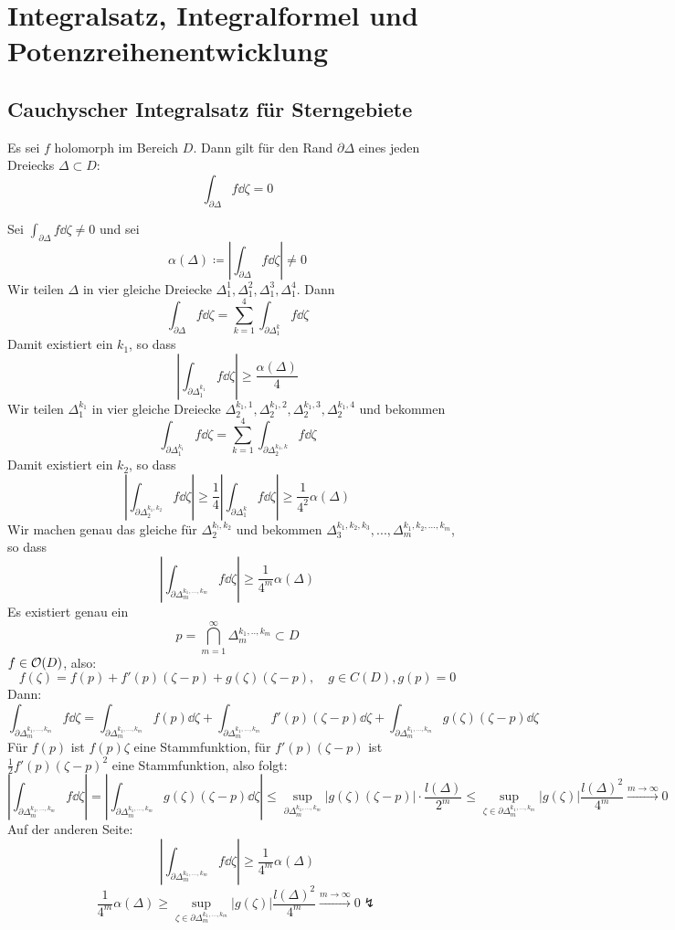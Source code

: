 \chapter{Integralsatz, Integralformel und Potenzreihenentwicklung}
\section{Cauchyscher Integralsatz f\"ur Sterngebiete}
\begin{lemma}
Es sei $ f $ holomorph im Bereich $ D $. Dann gilt f\"ur den Rand $ \partial \Delta $ eines jeden Dreiecks $ \Delta\subset D $:
\[ \int_{\partial\Delta}^{} f\dd\zeta = 0 \]
\end{lemma}
\begin{beweis}
Sei $ \int_{\partial\Delta}^{} f\dd\zeta\neq 0 $ und sei \[ \alpha(\Delta)\coloneqq\left|\int_{\partial\Delta}^{} f\dd\zeta\right|\neq 0 \]
Wir teilen $ \Delta $ in vier gleiche Dreiecke $ \Delta_1^1, \Delta_1^2,\Delta_1^3,\Delta_1^4 $. Dann
\[ \int_{\partial\Delta}f\dd\zeta=\sum_{k=1}^{4}\int_{\partial\Delta_1^k}^{}f\dd\zeta \]
Damit existiert ein $ k_1 $, so dass
\[ \left|\int_{\partial\Delta_1^{k_1}}f\dd\zeta\right|\geq\frac{\alpha(\Delta)}{4} \]
Wir teilen $ \Delta_1^{k_1} $ in vier gleiche Dreiecke $ \Delta_2^{k_1,1},\Delta_2^{k_1,2},\Delta_2^{k_1,3},\Delta_2^{k_1,4} $ und bekommen
\[ \int_{\partial\Delta_1^{k_1}}f\dd\zeta=\sum_{k=1}^4\int_{\partial\Delta_2^{k_1,k}}f\dd\zeta \]
Damit existiert ein $ k_2 $, so dass
\[ \left|\int_{\partial\Delta_2^{k_1,k_2}}^{}f\dd\zeta\right|\geq\frac{1}{4}\left|\int_{\partial\Delta_1^k}^{}f\dd\zeta\right|\geq\frac{1}{4^2}\alpha(\Delta) \]
Wir machen genau das gleiche f\"ur $ \Delta_2^{k_!,k_2} $ und bekommen $ \Delta_3^{k_1,k_2,k_3},...,\Delta_m^{k_1,k_2,...,k_m} $, so dass
\[ \left|\int_{\partial\Delta_m^{k_1,...,k_m}}^{} f\dd\zeta\right|\geq\frac{1}{4^m}\alpha(\Delta) \]
Es existiert genau ein \[ p=\bigcap_{m=1}^\infty \Delta_m^{k_1,..,k_m}\subset D\]
$ f\in\mathcal O(D) $, also:
\[ f(\zeta)=f(p)+f'(p)(\zeta-p)+g(\zeta)(\zeta-p),\quad g\in C(D),g(p)=0 \]
Dann:
\[ \int_{\partial\Delta_m^{k_1,...,k_m}}^{}f\dd\zeta=\int_{\partial\Delta_m^{k_1,...,k_m}}^{}f(p)\dd\zeta+\int_{\partial\Delta_m^{k_1,...,k_m}}^{}f'(p)(\zeta-p)\dd\zeta+\int_{\partial\Delta_m^{k_1,...,k_m}}^{}g(\zeta)(\zeta-p)\dd\zeta \]
F\"ur $ f(p) $ ist $ f(p)\zeta $ eine Stammfunktion, f\"ur $ f'(p)(\zeta-p) $ ist $ \frac{1}{2}f'(p)(\zeta-p)^2 $ eine Stammfunktion, also folgt:
\[ \left|\int_{\partial\Delta_m^{k_1,...,k_m}}^{}f\dd\zeta\right|=\left|\int_{\partial\Delta_m^{k_1,...,k_m}}^{}g(\zeta)(\zeta-p)\dd\zeta\right|\leq\sup_{\partial\Delta_m^{k_1,...,k_m}}|g(\zeta)(\zeta-p)|\cdot\frac{l(\Delta)}{2^m}\leq\sup_{\zeta\in\partial\Delta_m^{k_1,...,k_m}}|g(\zeta)|\frac{l(\Delta)^2}{4^m}\xrightarrow{m\to\infty}0 \]
Auf der anderen Seite:
\[ \left|\int_{\partial\Delta_m^{k_1,...,k_m}}f\dd\zeta\right|\geq\frac{1}{4^m}\alpha(\Delta) \]
\[ \frac{1}{4^m}\alpha(\Delta)\geq\sup_{\zeta\in\partial\Delta_m^{k_1,...,k_m}}|g(\zeta)|\frac{l(\Delta)^2}{4^m}\xrightarrow{m\to\infty}0\lightning \]
\end{beweis}
